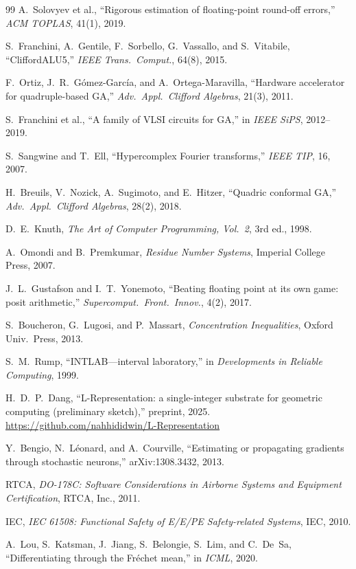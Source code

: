 \documentclass[11pt,a4paper]{article}
\theoremstyle{definition}
\theoremstyle{plain}
\theoremstyle{remark}
\begin{document}
\begin{thebibliography}{99}
A.~Solovyev et al.,
``Rigorous estimation of floating-point round-off errors,''
\emph{ACM TOPLAS}, 41(1), 2019.

S.~Franchini, A.~Gentile, F.~Sorbello, G.~Vassallo, and S.~Vitabile,
``CliffordALU5,''
\emph{IEEE Trans.\ Comput.}, 64(8), 2015.

F.~Ortiz, J.~R.~G\'{o}mez-Garc\'{i}a, and A.~Ortega-Maravilla,
``Hardware accelerator for quadruple-based GA,''
\emph{Adv.\ Appl.\ Clifford Algebras}, 21(3), 2011.

S.~Franchini et al.,
``A family of VLSI circuits for GA,''
in \emph{IEEE SiPS}, 2012--2019.

S.~Sangwine and T.~Ell,
``Hypercomplex Fourier transforms,''
\emph{IEEE TIP}, 16, 2007.

H.~Breuils, V.~Nozick, A.~Sugimoto, and E.~Hitzer,
``Quadric conformal GA,''
\emph{Adv.\ Appl.\ Clifford Algebras}, 28(2), 2018.

D.~E.~Knuth,
\emph{The Art of Computer Programming, Vol.\ 2}, 3rd ed., 1998.

A.~Omondi and B.~Premkumar,
\emph{Residue Number Systems}, Imperial College Press, 2007.

J.~L.~Gustafson and I.~T.~Yonemoto,
``Beating floating point at its own game: posit arithmetic,''
\emph{Supercomput.\ Front.\ Innov.}, 4(2), 2017.

S.~Boucheron, G.~Lugosi, and P.~Massart,
\emph{Concentration Inequalities}, Oxford Univ.\ Press, 2013.

S.~M.~Rump,
``INTLAB---interval laboratory,''
in \emph{Developments in Reliable Computing}, 1999.

H.~D.~P.~Dang,
``L-Representation: a single-integer substrate for geometric computing
(preliminary sketch),''
preprint, 2025.
\url{https://github.com/nahhididwin/L-Representation}

Y.~Bengio, N.~L\'{e}onard, and A.~Courville,
``Estimating or propagating gradients through stochastic neurons,''
arXiv:1308.3432, 2013.

RTCA,
\emph{DO-178C: Software Considerations in Airborne Systems and Equipment
Certification}, RTCA, Inc., 2011.

IEC,
\emph{IEC 61508: Functional Safety of E/E/PE Safety-related Systems},
IEC, 2010.

A.~Lou, S.~Katsman, J.~Jiang, S.~Belongie, S.~Lim, and C.~De~Sa,
``Differentiating through the Fr\'echet mean,''
in \emph{ICML}, 2020.

\end{thebibliography}
\end{document}
